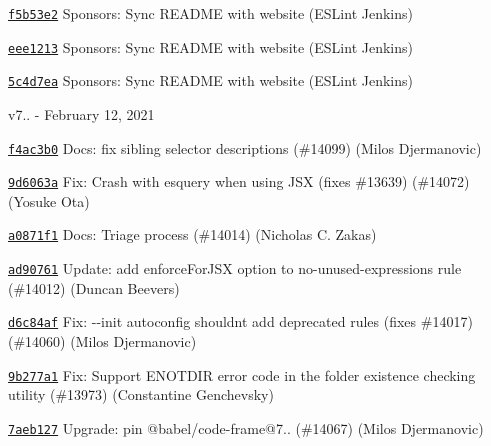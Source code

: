 \begin{DoxyItemize}
\item \href{https://github.com/eslint/eslint/commit/f5b53e285ab5286ea382d73b379b820f649c20d0}{\texttt{ {\ttfamily f5b53e2}}} Sponsors\+: Sync README with website (ESLint Jenkins)
\item \href{https://github.com/eslint/eslint/commit/eee12134ce0956e9f825c1630776b1731551a948}{\texttt{ {\ttfamily eee1213}}} Sponsors\+: Sync README with website (ESLint Jenkins)
\item \href{https://github.com/eslint/eslint/commit/5c4d7ea8d2e8d137c42b918dc99a84b4a5fed9b3}{\texttt{ {\ttfamily 5c4d7ea}}} Sponsors\+: Sync README with website (ESLint Jenkins)
\end{DoxyItemize}

v7.. -\/ February 12, 2021


\begin{DoxyItemize}
\item \href{https://github.com/eslint/eslint/commit/f4ac3b0e7072fbd3c14e9c64ff0c2c255a4eb730}{\texttt{ {\ttfamily f4ac3b0}}} Docs\+: fix sibling selector descriptions (\#14099) (Milos Djermanovic)
\item \href{https://github.com/eslint/eslint/commit/9d6063add931f0803cae1676d5df307baf114360}{\texttt{ {\ttfamily 9d6063a}}} Fix\+: Crash with esquery when using JSX (fixes \#13639) (\#14072) (Yosuke Ota)
\item \href{https://github.com/eslint/eslint/commit/a0871f1840060bd23cfe0952a096b107142db2f0}{\texttt{ {\ttfamily a0871f1}}} Docs\+: Triage process (\#14014) (Nicholas C. Zakas)
\item \href{https://github.com/eslint/eslint/commit/ad9076183bc2c2029525edfc4596e403999348d1}{\texttt{ {\ttfamily ad90761}}} Update\+: add enforce\+For\+JSX option to no-\/unused-\/expressions rule (\#14012) (Duncan Beevers)
\item \href{https://github.com/eslint/eslint/commit/d6c84af67318537177ffac0120a81af08e3e9df4}{\texttt{ {\ttfamily d6c84af}}} Fix\+: {\ttfamily -\/-\/init} autoconfig shouldn\textquotesingle{}t add deprecated rules (fixes \#14017) (\#14060) (Milos Djermanovic)
\item \href{https://github.com/eslint/eslint/commit/9b277a16a7261e51b7ba36d6de7f996e9203a6a4}{\texttt{ {\ttfamily 9b277a1}}} Fix\+: Support ENOTDIR error code in the folder existence checking utility (\#13973) (Constantine Genchevsky)
\item \href{https://github.com/eslint/eslint/commit/7aeb12798f2b9da706f3593f26a02e717929c9af}{\texttt{ {\ttfamily 7aeb127}}} Upgrade\+: pin @babel/code-\/frame@7.. (\#14067) (Milos Djermanovic)

\end{DoxyItemize}
